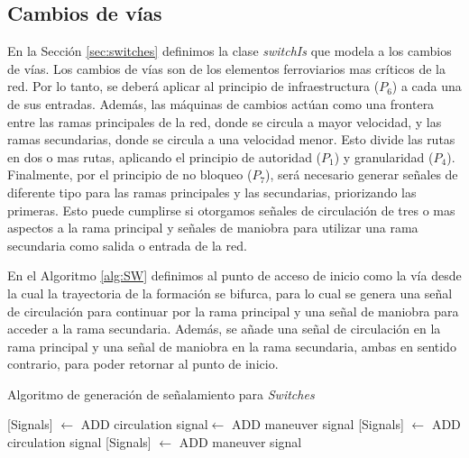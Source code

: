 \subsection{Cambios de vías}
	\label{sec:signal_switches}
	
    
    En la Sección \ref{sec:switches} definimos la clase \textit{switchIs} que modela a los cambios de vías. Los cambios de vías son de los elementos ferroviarios mas críticos de la red. Por lo tanto, se deberá aplicar al principio de infraestructura ($P_6$) a cada una de sus entradas. Además, las máquinas de cambios actúan como una frontera entre las ramas principales de la red, donde se circula a mayor velocidad, y las ramas secundarias, donde se circula a una velocidad menor. Esto divide las rutas en dos o mas rutas, aplicando el principio de autoridad ($P_1$) y granularidad ($P_4$). Finalmente, por el principio de no bloqueo ($P_7$), será necesario generar señales de diferente tipo para las ramas principales y las secundarias, priorizando las primeras. Esto puede cumplirse si otorgamos señales de circulación de tres o mas aspectos a la rama principal y señales de maniobra para utilizar una rama secundaria como salida o entrada de la red.
    
    En el Algoritmo \ref{alg:SW} definimos al punto de acceso de inicio como la vía desde la cual la trayectoria de la formación se bifurca, para lo cual se genera una señal de circulación para continuar por la rama principal y una señal de maniobra para acceder a la rama secundaria. Además, se añade una señal de circulación en la rama principal y una señal de maniobra en la rama secundaria, ambas en sentido contrario, para poder retornar al punto de inicio. 
    
    \begin{algorithm}[H]
        \caption{Algoritmo de generación de señalamiento para \textit{Switches}}\label{alg:SW}
        \DontPrintSemicolon
        \SetNoFillComment
        \LinesNotNumbered 
        {
            {
                {
                    [Signals] $\gets$ ADD circulation signal\;
                    [Signals] $\gets$ ADD maneuver signal\;
                }
                {
                    [Signals] $\gets$ ADD circulation signal\;
                }
                {
                    [Signals] $\gets$ ADD maneuver signal\;
                }
            }   
        }
        \KwResult{[Signals]} 
    \end{algorithm}

